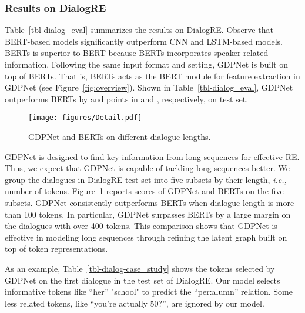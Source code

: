 \documentclass[letterpaper]{article} \usepackage{aaai21}  \usepackage{times}  \usepackage{helvet} \usepackage{courier}  \usepackage[hyphens]{url}  \usepackage{graphicx} \urlstyle{rm} \def\UrlFont{\rm}  \usepackage{graphicx}  \usepackage{natbib}  \usepackage{caption}
\newcommand{\ie}{\emph{i.e.,}\xspace}
\begin{document}
\subsubsection{Results on DialogRE}
Table~\ref{tbl-dialog_eval} summarizes the results on DialogRE. Observe that BERT-based models significantly outperform CNN and LSTM-based models. BERTs is superior to BERT because BERTs incorporates speaker-related information. Following the same input format and setting, GDPNet is built on top of BERTs. That is, BERTs acts as the BERT module for feature extraction in GDPNet (see Figure~\ref{fig:overview}). Shown in Table~\ref{tbl-dialog_eval},  GDPNet outperforms BERTs by  and  points in  and , respectively, on test set. 


\begin{figure}
\centering
\texttt{[image: figures/Detail.pdf]}
\caption{GDPNet and BERTs on different dialogue lengths.}
\label{fig:GDPvsBERTs}
\end{figure}




GDPNet is designed to find key information from long sequences for effective RE.  Thus, we expect that GDPNet is capable of tackling long sequences better.  We group the dialogues in DialogRE test set into five subsets by their length, \ie number of tokens. Figure~\ref{fig:GDPvsBERTs} reports  scores of GDPNet and BERTs on the five subsets. GDPNet consistently outperforms BERTs when dialogue length is more than 100 tokens. In particular, GDPNet surpasses BERTs by a large margin on the dialogues with over 400 tokens. This comparison shows that GDPNet is effective in modeling long sequences through refining the latent graph built on top of token representations.





As an example, Table~\ref{tbl-dialog-case_study} shows the tokens selected by GDPNet on the first dialogue in the test set of DialogRE. Our model selects informative tokens like ``her'' "school" to predict the ``per:alumn'' relation. Some less related tokens, like ``you're actually 50?'', are ignored by our model.
\end{document}
